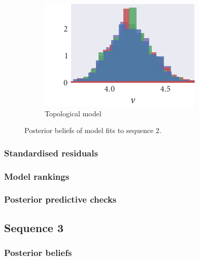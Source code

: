 \begin{figure}[p]
\begin{subfigure}[b]{\textwidth}
    \includegraphics{seq2/top_hist_nu.pdf}%
    \caption{Topological model}
  \end{subfigure}
  \caption{Posterior beliefs of model fits to sequence $2$.}
\end{figure}

\subsubsection{Standardised residuals}

\subsubsection{Model rankings}

\subsubsection{Posterior predictive checks}

\subsection{Sequence 3}

\subsubsection{Posterior beliefs}


